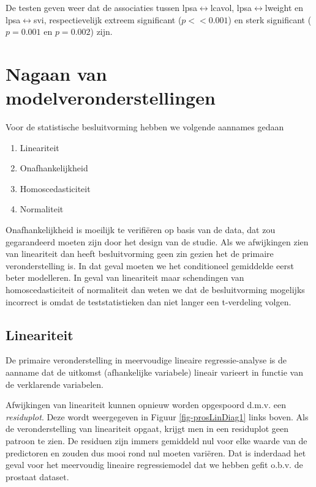 \documentclass[
  dutch,
  letterpaper,
  12pt]{book}
\providecommand{\tightlist}{%
  \setlength{\itemsep}{0pt}\setlength{\parskip}{0pt}}
\theoremstyle{definition}
\theoremstyle{definition}
\theoremstyle{definition}
\theoremstyle{remark}
\begin{document}
De testen geven weer dat de associaties tussen
lpsa\(\leftrightarrow\)lcavol, lpsa\(\leftrightarrow\)lweight en
lpsa\(\leftrightarrow\)svi, respectievelijk extreem significant
(\(p << 0.001\)) en sterk significant (\(p=0.001\) en \(p=0.002\)) zijn.

\section{Nagaan van
modelveronderstellingen}\label{nagaan-van-modelveronderstellingen-1}

Voor de statistische besluitvorming hebben we volgende aannames gedaan

\begin{enumerate}
\def\labelenumi{\arabic{enumi}.}
\tightlist
\item
  Lineariteit
\item
  Onafhankelijkheid\\
\item
  Homoscedasticiteit
\item
  Normaliteit
\end{enumerate}

Onafhankelijkheid is moeilijk te verifiëren op basis van de data, dat
zou gegarandeerd moeten zijn door het design van de studie. Als we
afwijkingen zien van lineariteit dan heeft besluitvorming geen zin
gezien het de primaire veronderstelling is. In dat geval moeten we het
conditioneel gemiddelde eerst beter modelleren. In geval van lineariteit
maar schendingen van homoscedasticiteit of normaliteit dan weten we dat
de besluitvorming mogelijks incorrect is omdat de teststatistieken dan
niet langer een t-verdeling volgen.

\subsection{Lineariteit}\label{lineariteit-1}

De primaire veronderstelling in meervoudige lineaire regressie-analyse
is de aanname dat de uitkomst (afhankelijke variabele) lineair varieert
in functie van de verklarende variabelen.

Afwijkingen van lineariteit kunnen opnieuw worden opgespoord d.m.v. een
\emph{residuplot}. Deze wordt weergegeven in Figuur
\ref{fig-prosLinDiag1} links boven. Als de veronderstelling van
lineariteit opgaat, krijgt men in een residuplot geen patroon te zien.
De residuen zijn immers gemiddeld nul voor elke waarde van de
predictoren en zouden dus mooi rond nul moeten variëren. Dat is
inderdaad het geval voor het meervoudig lineaire regressiemodel dat we
hebben gefit o.b.v. de prostaat dataset.
\end{document}
